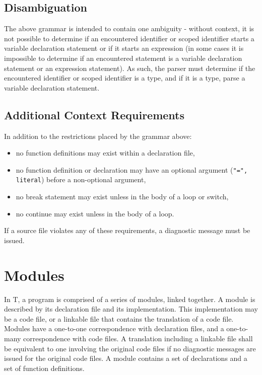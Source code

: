 \documentclass[letterpaper,12pt]{book}
\begin{document}
\section{Disambiguation}

The above grammar is intended to contain one ambiguity - without context, it is not possible to determine if an encountered identifier or scoped identifier starts a variable declaration statement or if it starts an expression (in some cases it is impossible to determine if an encountered statement is a variable declaration statement or an expression statement). As such, the parser must determine if the encountered identifier or scoped identifier is a type, and if it is a type, parse a variable declaration statement.

\section{Additional Context Requirements}

In addition to the restrictions placed by the grammar above:
\begin{itemize}
	\item no function definitions may exist within a declaration file,
	\item no function definition or declaration may have an optional argument (\texttt{"=", literal}) before a non-optional argument,
	\item no break statement may exist unless in the body of a loop or switch,
	\item no continue may exist unless in the body of a loop.
\end{itemize}

If a source file violates any of these requirements, a diagnostic message must be issued.

\chapter{Modules}

In T, a program is comprised of a series of modules, linked together. A module is described by its declaration file and its implementation. This implementation may be a code file, or a linkable file that contains the translation of a code file. Modules have a one-to-one correspondence with declaration files, and a one-to-many correspondence with code files. A translation including a linkable file shall be equivalent to one involving the original code files if no diagnostic messages are issued for the original code files. A module contains a set of declarations and a set of function definitions.
\end{document}

